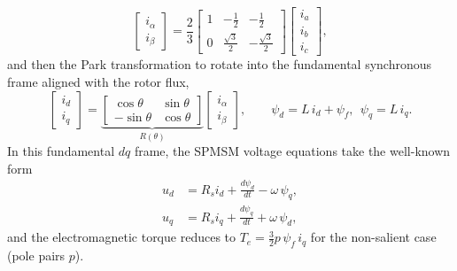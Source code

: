 \begin{equation}
\begin{bmatrix} i_\alpha \\[2pt] i_\beta \end{bmatrix}
= \frac{2}{3}
\begin{bmatrix}
1 & -\tfrac{1}{2} & -\tfrac{1}{2} \\
0 & \tfrac{\sqrt{3}}{2} & -\tfrac{\sqrt{3}}{2}
\end{bmatrix}
\begin{bmatrix} i_a \\[2pt] i_b \\[2pt] i_c \end{bmatrix},
\label{eq:clarke}
\end{equation}
and then the Park transformation to rotate into the fundamental synchronous frame aligned with the rotor flux,
\begin{equation}
\begin{bmatrix} i_d \\[2pt] i_q \end{bmatrix}
=
\underbrace{\begin{bmatrix}
\cos\theta & \sin\theta \\
-\sin\theta & \cos\theta
\end{bmatrix}}_{R(\theta)}
\begin{bmatrix} i_\alpha \\[2pt] i_\beta \end{bmatrix},
\qquad
\psi_d = L\,i_d+\psi_f,\ \ \psi_q = L\,i_q .
\label{eq:park}
\end{equation}
In this fundamental $dq$ frame, the SPMSM voltage equations take the well-known form
\begin{equation}
\boxed{
\begin{aligned}
u_d &= R_s i_d + \frac{d\psi_d}{dt} - \omega\,\psi_q,\\
u_q &= R_s i_q + \frac{d\psi_q}{dt} + \omega\,\psi_d,
\end{aligned}}
\label{eq:fundamental-dq}
\end{equation}
and the electromagnetic torque reduces to $T_e=\tfrac{3}{2}p\,\psi_f\,i_q$ for the non-salient case (pole pairs $p$).

